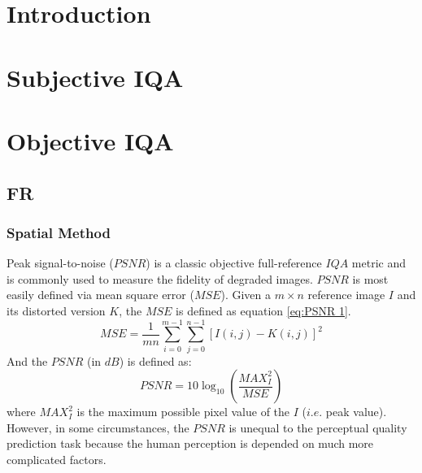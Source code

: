 \documentclass[journal]{IEEEtran}
\begin{document}
\IEEEpeerreviewmaketitle



\section{Introduction}

\section{Subjective IQA}

\section{Objective IQA}

\subsection{FR}

\subsubsection{Spatial Method}
Peak signal-to-noise ($PSNR$) is a classic objective full-reference $IQA$ metric and is commonly used to measure the fidelity of degraded images. $PSNR$ is most easily defined via mean square error ($MSE$). Given a $m \times n$ reference image $I$ and its distorted version $K$, the $MSE$ is defined as equation \ref{eq:PSNR 1}.
\begin{equation}
MSE = \frac{1}{mn} \sum\limits_{i=0}^{m-1} \sum\limits_{j=0}^{n-1} [I(i,j)-K(i,j)]^2
\label{eq:PSNR 1}
\end{equation}
And the $PSNR$ (in $dB$) is defined as:
\begin{equation}
PSNR = 10\log_{10} (\frac{MAX_I^2}{MSE})
\label{eq:PSNR 2}
\end{equation}
where $MAX_I^2$ is the maximum possible pixel value of the $I$ ($i.e.$ peak value). However, in some circumstances, the $PSNR$ is unequal to the perceptual quality prediction task because the human perception is depended on much more complicated factors.
\end{document}
